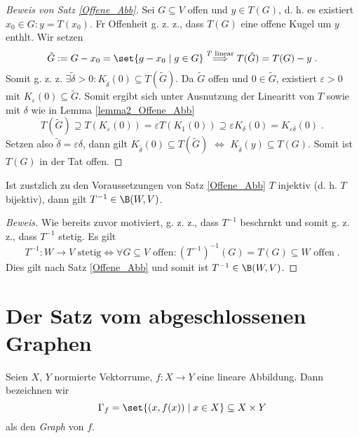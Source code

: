 \begin{theorem}
\begin{proof}[Beweis von Satz \ref{Offene_Abb}]
	Sei \(G\subseteq V\) offen und \(y\in T(G)\), d. h. es existiert \(x_0 \in G: y = T(x_0)\). F\us r Offenheit g. z. z., dass \(T(G)\) eine offene Kugel um \(y\) enth\as lt. Wir setzen
	\[\tilde G : = G -x_0 = \set{g-x_0\;\vert\;g\in G} \overset{T\text{ linear}}{\Longrightarrow} T(\tilde G) = T(G) - y\;.\]
 Somit g. z. z. \(\exists \tilde \delta > 0 : K_{\tilde \delta}(0)\subseteq T(\tilde G)\). Da \(\tilde G\) offen und \(0 \in \tilde G\), existiert \(\varepsilon > 0\) mit \(K_\varepsilon(0) \subseteq \tilde G\). Somit ergibt sich unter Ausnutzung der Linearit\as t von $T$ sowie mit  \(\delta\) wie in Lemma \ref{lemma2_Offene_Abb}
 \[T(\tilde G) \supseteq T(K_\varepsilon(0)) = \varepsilon T(K_1(0)) \supseteq \varepsilon K_\delta(0) = K_{\varepsilon\delta}(0)\;. \]
 Setzen also \(\tilde \delta = \varepsilon\delta\), dann gilt \(K_{\tilde \delta}(0) \subseteq T(\tilde G)\) \(\iff\) \(K_{\tilde \delta}(y) \subseteq T(G)\). Somit ist \(T(G)\) in der Tat offen.
\end{proof}
	
\begin{theorem}[Schlussfolgerung] Ist zus\as tzlich zu den Voraussetzungen von Satz \ref{Offene_Abb} $T$ injektiv (d. h. \(T\) bijektiv), dann gilt \(T^{-1} \in \B(W,V)\).
	\label{Inverse_Mapping}
\end{theorem}
\begin{proof}[Beweis]
	Wie bereits zuvor motiviert, g. z. z., dass \(T^{-1} \) beschr\as nkt und somit g. z. z., dass \(T^{-1}\) stetig. Es gilt 
	\[T^{-1}: W\to V \text{ stetig} \iff \forall G \subseteq V \text{ offen}: (T^{-1})^{-1}(G) = T(G) \subseteq W \text{ offen}\;.\] 
	Dies gilt nach Satz \ref{Offene_Abb} und somit ist \(T^{-1}\in \B(W,V)\).
\end{proof}



\section{Der Satz vom abgeschlossenen Graphen}
\begin{definition}
	Seien $X$, $Y$ normierte Vektorr\as ume, \(f:X \to Y\) eine lineare Abbildung. Dann bezeichnen wir 
	\[\Gamma_f = \set{(x,f(x)) \;\vert\; x \in X}\subseteq X\times Y\]
	als den \textit{Graph} von $f$.
\end{definition}


\end{theorem}
